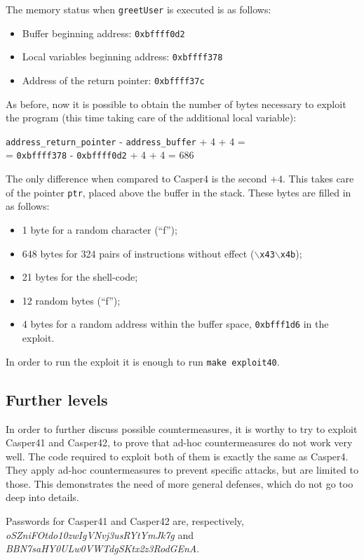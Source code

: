 The memory status when \texttt{greetUser} is executed is as follows:
\begin{itemize}
	\item Buffer beginning address: \texttt{0xbffff0d2}
	\item Local variables beginning address: \texttt{0xbffff378}
	\item Address of the return pointer: \texttt{0xbffff37c}
\end{itemize}
As before, now it is possible to obtain the number of bytes necessary to exploit the program (this time taking care of the additional local variable):

\begin{center}
	\texttt{address\_return\_pointer} - \texttt{address\_buffer} + 4 + 4 =\\
	= \texttt{0xbffff378} - \texttt{0xbffff0d2} + 4 + 4 = 686
\end{center}


The only difference when compared to Casper4 is the second $+ 4$. This takes care of the pointer \texttt{ptr}, placed above the buffer in the stack. These bytes are filled in as follows:
\begin{itemize}
	\item 1 byte for a random character (``f'');
	\item 648 bytes for 324 pairs of instructions without effect (\texttt{$\backslash$x43$\backslash$x4b});
	\item 21 bytes for the shell-code;
	\item 12 random bytes (``f'');
	\item 4 bytes for a random address within the buffer space, \texttt{0xbfff1d6} in the exploit.
\end{itemize}

In order to run the exploit it is enough to run \texttt{make exploit40}.

\subsection{Further levels}
In order to further discuss possible countermeasures, it is worthy to try to exploit Casper41 and Casper42, to prove that ad-hoc countermeasures do not work very well. The code required to exploit both of them is exactly the same as Casper4. They apply ad-hoc countermeasures to prevent specific attacks, but are limited to those. This demonstrates the need of more general defenses, which do not go too deep into details. 

Passwords for Casper41 and Casper42 are, respectively, \\\textit{oSZniFOtdo10zwIgVNvj3usRYtYmJk7g} and \\\textit{BBN7saHY0ULw0VWTdgSKtx2z3RodGEnA}.